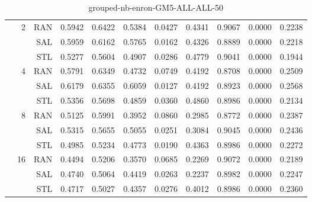 \begin{center}
\begin{table}[htbp]
\begin{tabular}{ | r | r | r | r | r | r | r | r | r | r | r |}
 & \multirow{3}{*}{2} & RAN & 0.5942 & 0.6422 & 0.5384 & 0.0427 & 0.4341 & 0.9067 & 0.0000 & 0.2238\\ \cline{3-11}
 &   & SAL & 0.5959 & 0.6162 & 0.5765 & 0.0162 & 0.4326 & 0.8889 & 0.0000 & 0.2218\\ \cline{3-11}
 &   & STL & 0.5277 & 0.5604 & 0.4907 & 0.0286 & 0.4779 & 0.9041 & 0.0000 & 0.1944\\ \cline{2-11}
 & \multirow{3}{*}{4} & RAN & 0.5791 & 0.6349 & 0.4732 & 0.0749 & 0.4192 & 0.8708 & 0.0000 & 0.2509\\ \cline{3-11}
 &   & SAL & 0.6179 & 0.6355 & 0.6059 & 0.0127 & 0.4192 & 0.8923 & 0.0000 & 0.2568\\ \cline{3-11}
 &   & STL & 0.5356 & 0.5698 & 0.4859 & 0.0360 & 0.4860 & 0.8986 & 0.0000 & 0.2134\\ \cline{2-11}
 & \multirow{3}{*}{8} & RAN & 0.5125 & 0.5991 & 0.3952 & 0.0860 & 0.2985 & 0.8772 & 0.0000 & 0.2387\\ \cline{3-11}
 &   & SAL & 0.5315 & 0.5655 & 0.5055 & 0.0251 & 0.3084 & 0.9045 & 0.0000 & 0.2436\\ \cline{3-11}
 &   & STL & 0.4985 & 0.5234 & 0.4773 & 0.0190 & 0.4363 & 0.8986 & 0.0000 & 0.2272\\ \cline{2-11}
 & \multirow{3}{*}{16} & RAN & 0.4494 & 0.5206 & 0.3570 & 0.0685 & 0.2269 & 0.9072 & 0.0000 & 0.2189\\ \cline{3-11}
 &   & SAL & 0.4740 & 0.5064 & 0.4419 & 0.0263 & 0.2237 & 0.8982 & 0.0000 & 0.2247\\ \cline{3-11}
 &   & STL & 0.4717 & 0.5027 & 0.4357 & 0.0276 & 0.4012 & 0.8986 & 0.0000 & 0.2360\\ \cline{2-11}
\hline
\end{tabular}
\caption{grouped-nb-enron-GM5-ALL-ALL-50}
\end{table}
\end{center}

